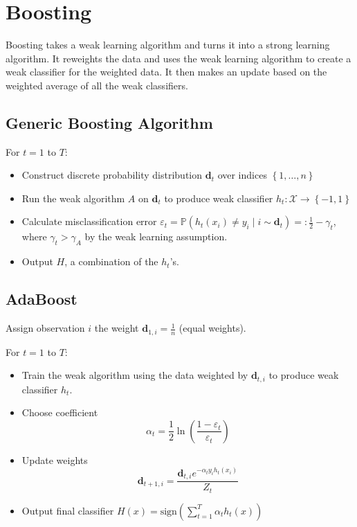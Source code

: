 \documentclass{article}
\begin{document}

\section{Boosting}
Boosting takes a weak learning algorithm and turns it into a strong learning algorithm. It reweights the data and uses the weak learning algorithm to create a weak classifier for the weighted data. It then makes an update based on the weighted average of all the weak classifiers.


\subsection{Generic Boosting Algorithm}
For $t=1$ to $T $:
\begin{itemize}
	\item Construct discrete probability distribution $\mathbf{d}_t$ over indices $\left\{ 1,\dots,n \right\}$
	\item Run the weak algorithm $A$ on $\mathbf{d}_t$ to produce weak classifier $h_t: \mathcal{X}\to\left\{ -1,1 \right\}$
	 \item Calculate misclassification error $\varepsilon_t = \mathbb{P}(h_t(x_i) \neq y_i \;|\; i\sim \mathbf{d}_t) =: \frac{1}{2} -\gamma_t$, where $\gamma_t > \gamma_A$ by the weak learning assumption.
	\item Output $H$, a combination of the $h_t$'s.
\end{itemize}



\subsection{AdaBoost}
Assign observation $i$ the weight $\mathbf{d}_{1,i}=\frac{1}{n} $ (equal weights).

For $t=1$ to $T$:
\begin{itemize}
	\item Train the weak algorithm using the data weighted by $\mathbf{d}_{t,i}$ to produce weak classifier $h_t$.
	\item Choose coefficient
		\[
			\alpha_t = \frac{1}{2} \ln\left( \frac{1-\varepsilon_t}{\varepsilon_t}  \right)
		\] 
	\item Update weights
		\[
			\mathbf{d}_{t+1,i} = \frac{\mathbf{d}_{t,i} e^{-\alpha_t y_i h_t(x_i)}}{Z_t} 
		\] 
	\item Output final classifier $H(x) = \text{sign}\left( \sum_{t=1}^{T} \alpha_t h_t(x) \right)$
\end{itemize}
\end{document}

